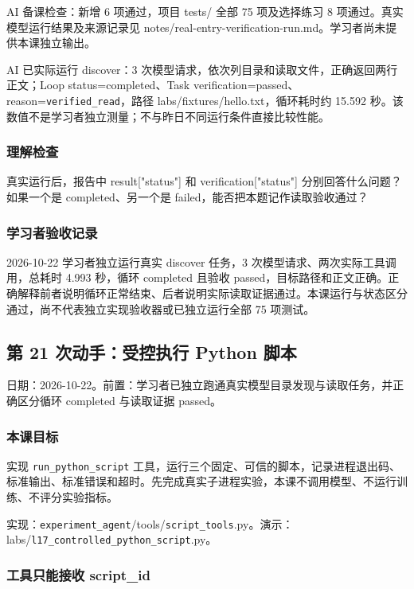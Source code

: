 AI 备课检查：新增 6 项通过，项目 tests/ 全部 75 项及选择练习 8 项通过。真实模型运行结果及来源记录见 notes/real-entry-verification-run.md。学习者尚未提供本课独立输出。

AI 已实际运行 discover：3 次模型请求，依次列目录和读取文件，正确返回两行正文；Loop status=completed、Task verification=passed、reason=\nolinkurl{verified_read}，路径 labs/fixtures/hello.txt，循环耗时约 15.592 秒。该数值不是学习者独立测量；不与昨日不同运行条件直接比较性能。

\subsubsection{理解检查}

真实运行后，报告中 result["status"] 和 verification["status"] 分别回答什么问题？如果一个是 completed、另一个是 failed，能否把本题记作读取验收通过？

\subsubsection{学习者验收记录}

2026-10-22 学习者独立运行真实 discover 任务，3 次模型请求、两次实际工具调用，总耗时 4.993 秒，循环 completed 且验收 passed，目标路径和正文正确。正确解释前者说明循环正常结束、后者说明实际读取证据通过。本课运行与状态区分通过，尚不代表独立实现验收器或已独立运行全部 75 项测试。

\subsection{第 21 次动手：受控执行 Python 脚本}

日期：2026-10-22。前置：学习者已独立跑通真实模型目录发现与读取任务，并正确区分循环 completed 与读取证据 passed。

\subsubsection{本课目标}

实现 \nolinkurl{run_python_script} 工具，运行三个固定、可信的脚本，记录进程退出码、标准输出、标准错误和超时。先完成真实子进程实验，本课不调用模型、不运行训练、不评分实验指标。

实现：\nolinkurl{experiment_agent}/tools/\nolinkurl{script_tools}.py。演示：labs/\nolinkurl{l17_controlled_python_script}.py。

\subsubsection{工具只能接收 script\_id}

